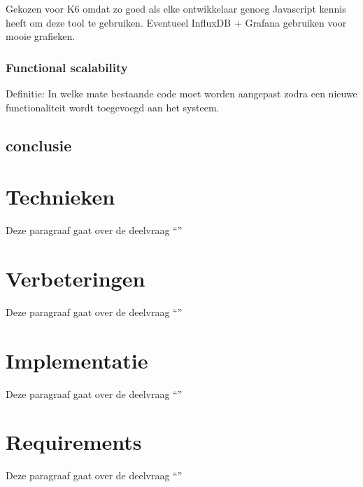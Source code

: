 Gekozen voor K6 omdat zo goed als elke ontwikkelaar genoeg Javascript kennis heeft om deze tool te gebruiken. Eventueel InfluxDB + Grafana gebruiken voor mooie grafieken.



\subsubsection{Functional scalability}
Definitie: In welke mate bestaande code moet worden aangepast zodra een nieuwe functionaliteit wordt toegevoegd aan het systeem.


\subsection{conclusie}

\section{Technieken}
Deze paragraaf gaat over de deelvraag \enquote{\deeltechnieken}

\section{Verbeteringen}
Deze paragraaf gaat over de deelvraag \enquote{\deelverbetering}


\section{Implementatie}
Deze paragraaf gaat over de deelvraag \enquote{\deelimplementatie}


\section{Requirements}
Deze paragraaf gaat over de deelvraag \enquote{\deelrequirements}